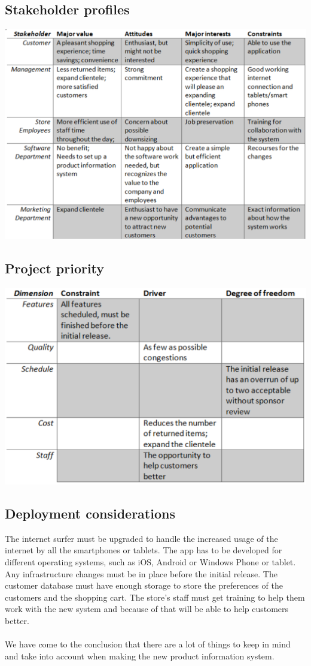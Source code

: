 \documentclass[a4paper]{article}
\begin{document}
\subsection*{Stakeholder profiles}
\includegraphics[scale=0.7]{stakeholder_profiles.eps}

\subsection*{Project priority}
\includegraphics[scale=0.9]{project_priority.eps}

\subsection*{Deployment considerations}
The internet surfer must be upgraded to handle the increased usage of the internet by all the smartphones or tablets. The app has to be developed for different operating systems, such as iOS, Android or Windows Phone or tablet. Any infrastructure changes must be in place before the initial release. The customer database must have enough storage to store the preferences of the customers and the shopping cart. The store’s staff must get training to help them work with the new system and because of that will be able to help customers better.\\
\\
We have come to the conclusion that there are a lot of things to keep in mind and take into account when making the new product information system. 
\end{document}
